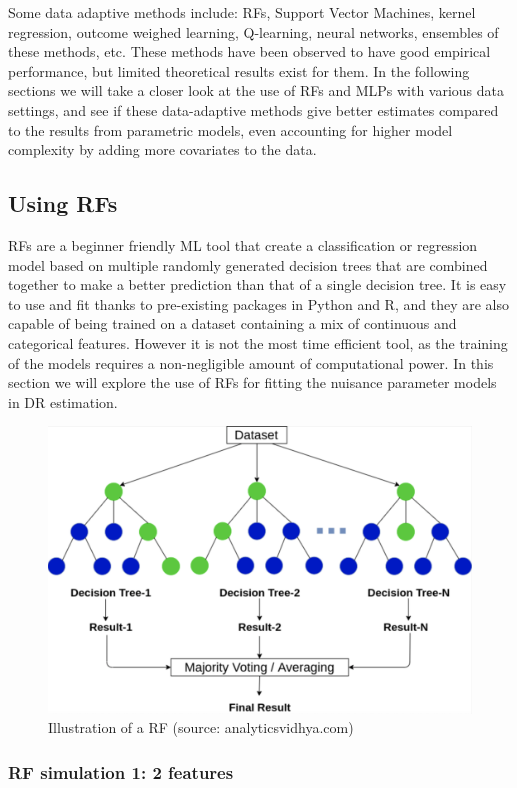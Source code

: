 \documentclass[12pt,twoside]{article}
\begin{document}
Some data adaptive methods include: RFs, Support Vector Machines, kernel regression, outcome weighed learning, Q-learning, neural networks, ensembles of these methods, etc. These methods have been observed to have good empirical performance, but limited theoretical results exist for them. In the following sections we will take a closer look at the use of RFs and MLPs with various data settings, and see if these data-adaptive methods give better estimates compared to the results from parametric models, even accounting for higher model complexity by adding more covariates to the data.

\subsection{Using RFs}

RFs are a beginner friendly ML tool that create a classification or regression model based on multiple randomly generated decision trees that are combined together to make a better prediction than that of a single decision tree. It is easy to use and fit thanks to pre-existing packages in Python and R, and they are also capable of being trained on a dataset containing a mix of continuous and categorical features. However it is not the most time efficient tool, as the training of the models requires a non-negligible amount of computational power. In this section we will explore the use of RFs for fitting the nuisance parameter models in DR estimation.

\begin{figure}
    \centering
    \includegraphics[width = 0.7\columnwidth]{figures/tree.png}
    \caption{Illustration of a RF (source: analyticsvidhya.com)}
    \label{fig:my_label}
\end{figure}


\subsubsection{RF simulation 1: 2 features}
\end{document}
